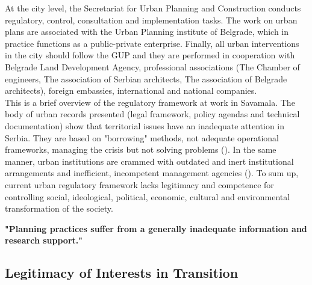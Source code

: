 \documentclass[11pt]{report}
\begin{document}
At the city level, the Secretariat for Urban Planning and Construction conducts regulatory, control, consultation and implementation tasks. The work on urban plans are associated with the Urban Planning institute of Belgrade, which in practice functions as a public-private enterprise. 
Finally, all urban interventions in the city should follow the GUP and they are performed in  cooperation  with  Belgrade Land Development Agency, professional  associations (The Chamber of engineers, The association of Serbian architects, The association of Belgrade architects), foreign  embassies, international and national companies.
\\
This is a brief overview of the regulatory framework at work in Savamala. 
The body of urban records presented (legal framework, policy agendas and technical documentation) show that territorial issues have an inadequate attention in Serbia.
They are based on "borrowing" methods, not adequate operational frameworks, managing the crisis but not solving problems
(\cite{adjustment of planning practice nedovic budic 2001, Vujosevic and Maricic 2012}).
In the same manner, urban institutions are crammed with outdated and inert institutional arrangements and inefficient, incompetent management agencies (\href{}{\citealt{vujosevic_conundrum_2012}}).
To sum up, current urban regulatory framework lacks legitimacy and competence for controlling social, ideological, political, economic, cultural and environmental transformation of the society.

\textbf{"Planning practices suffer from a generally inadequate information and research support." \cite{Vujosevic 2012}}

\subsection{Legitimacy of Interests in Transition}
\end{document}
